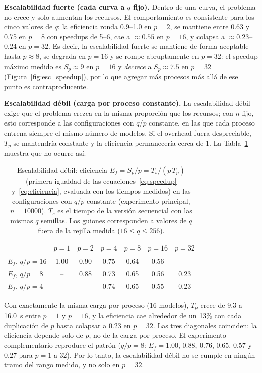 \documentclass[11pt, a4paper]{article}
\begin{document}
\textbf{Escalabilidad fuerte (cada curva a $q$ fijo).} Dentro de una curva, el problema no crece y solo aumentan los recursos. El comportamiento es consistente para los cinco valores de $q$: la eficiencia ronda 0.9--1.0 en $p = 2$, se mantiene entre 0.63 y 0.75 en $p = 8$ con speedups de 5--6, cae a $\approx 0.55$ en $p = 16$, y colapsa a $\approx 0.23$--$0.24$ en $p = 32$. Es decir, la escalabilidad fuerte se mantiene de forma aceptable hasta $p \approx 8$, se degrada en $p = 16$ y se rompe abruptamente en $p = 32$: el speedup máximo medido es $S_p \approx 9$ en $p = 16$ y \emph{decrece} a $S_p \approx 7.5$ en $p = 32$ (Figura~\ref{fig:esc_speedup}), por lo que agregar más procesos más allá de ese punto es contraproducente.

\textbf{Escalabilidad débil (carga por proceso constante).} La escalabilidad débil exige que el problema crezca en la misma proporción que los recursos; con $n$ fijo, esto corresponde a las configuraciones con $q/p$ constante, en las que cada proceso entrena siempre el mismo número de modelos. Si el overhead fuera despreciable, $T_p$ se mantendría constante y la eficiencia permanecería cerca de 1. La Tabla~\ref{tab:debil} muestra que no ocurre así.

\begin{table}[H]
\centering
\caption{Escalabilidad débil: eficiencia $E_f = S_p/p = T_s/(p\,T_p)$ (primera igualdad de las ecuaciones~\eqref{eq:speedup} y~\eqref{eq:eficiencia}, evaluada con los tiempos medidos) en las configuraciones con $q/p$ constante (experimento principal, $n = 10000$). $T_s$ es el tiempo de la versión secuencial con las mismas $q$ semillas. Los guiones corresponden a valores de $q$ fuera de la rejilla medida ($16 \le q \le 256$).}
\label{tab:debil}
\begin{tabular}{lcccccc}
\toprule
& $p=1$ & $p=2$ & $p=4$ & $p=8$ & $p=16$ & $p=32$ \\
\midrule
$E_f$, $q/p = 16$ & 1.00 & 0.90 & 0.75 & 0.64 & 0.56 & -- \\
$E_f$, $q/p = 8$  & --   & 0.88 & 0.73 & 0.65 & 0.56 & 0.23 \\
$E_f$, $q/p = 4$  & --   & --   & 0.74 & 0.65 & 0.55 & 0.23 \\
\bottomrule
\end{tabular}
\end{table}

Con exactamente la misma carga por proceso (16 modelos), $T_p$ crece de 9.3 a 16.0~s entre $p = 1$ y $p = 16$, y la eficiencia cae alrededor de un 13\% con cada duplicación de $p$ hasta colapsar a $0.23$ en $p = 32$. Las tres diagonales coinciden: la eficiencia depende solo de $p$, no de la carga por proceso. El experimento complementario reproduce el patrón ($q/p = 8$: $E_f = 1.00$, $0.88$, $0.76$, $0.65$, $0.57$ y $0.27$ para $p = 1$ a $32$). Por lo tanto, la escalabilidad débil no se cumple en ningún tramo del rango medido, y no solo en $p = 32$.
\end{document}
